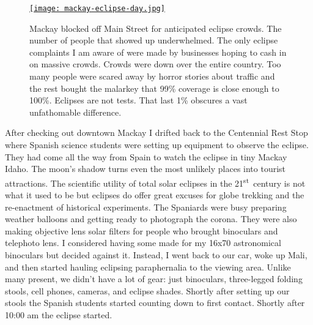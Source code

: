 \begin{figure}[htbp]
\centering
\href{https://conceptcontrol.smugmug.com/Places/USA-and-Canada/Idaho-Instants}{\texttt{[image: mackay-eclipse-day.jpg]}}
\caption{Mackay blocked off Main Street for anticipated eclipse crowds. The
number of people that showed up underwhelmed. The only eclipse
complaints I am aware of were made by businesses hoping to cash in on
massive crowds. Crowds were down over the entire country. Too many
people were scared away by horror stories about traffic and the rest
bought the malarkey that 99\% coverage is close enough to 100\%.
Eclipses are not tests. That last 1\% obscures a vast unfathomable
difference.}
\label{fig:5430x3}
\end{figure}



After checking out downtown Mackay I drifted back to the Centennial Rest
Stop where Spanish science students were setting up equipment to observe
the eclipse. They had come all the way from Spain to watch the eclipse
in tiny Mackay Idaho. The moon's shadow turns even the most unlikely
places into tourist attractions. The scientific utility of total solar
eclipses in the 21\textsuperscript{st}~century is not what it used to be
but eclipses do offer great excuses for globe trekking and the
re-enactment of historical experiments. The Spaniards were busy
preparing weather balloons and getting ready to photograph the corona.
They were also making objective lens solar filters for people who
brought binoculars and telephoto lens. I considered having some made for
my 16x70 astronomical binoculars but decided against it. Instead, I went
back to our car, woke up Mali, and then started hauling eclipsing
paraphernalia to the viewing area. Unlike many present, we didn't have a
lot of gear: just binoculars, three-legged folding stools, cell phones,
cameras, and eclipse shades. Shortly after setting up our stools the
Spanish students started counting down to first contact. Shortly after
10:00 am the eclipse started.


